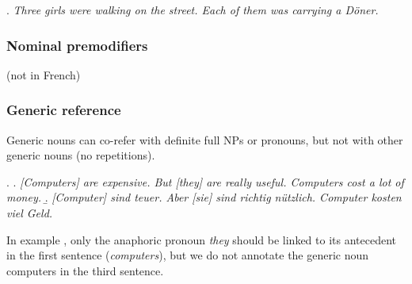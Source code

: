 \documentclass[a4paper]{article}
\begin{document}
{{\begin{itemize}
\ex.
{\sl Three girls were walking on the street. Each of them was carrying a D\"oner.}

\end{itemize}

\subsubsection{Nominal premodifiers}
(not in French)

% 
% 
% 

\subsubsection{Generic reference}

Generic nouns can co-refer with definite full NPs or pronouns, but not with other generic nouns (no repetitions).

\ex.
\a. {\sl [Computers] are expensive. But [they] are really useful. Computers cost a lot of money.}
\b.  {\sl  [Computer] sind teuer. Aber [sie] sind richtig nützlich. Computer kosten viel Geld.}

In example \Last, only the anaphoric pronoun {\sl they} should be linked to its antecedent in the first sentence ({\sl computers}), but we do not annotate the generic noun computers in the third sentence.

}}
\end{document}
